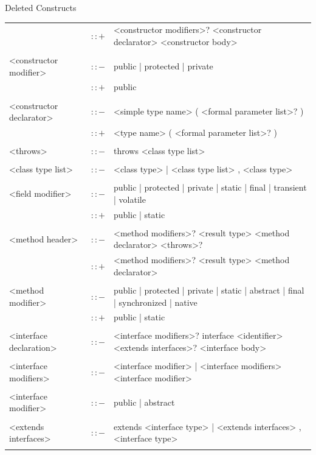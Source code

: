 \documentclass[landscape, 11pt]{article}
\begin{document}
\begin{qsection}{Deleted Constructs}
\begin{enumerate}[label=\bt{\theenumi.}]
\begin{longtable}{R{7cm} c L{15cm}}
															&	$\colon\colon+$	&	<constructor modifiers>? <constructor declarator> <constructor body> \\\\
				<constructor modifier>						&	$\colon\colon-$	&	public | protected | private \\
															&	$\colon\colon+$	&	public \\\\
				<constructor declarator>					&	$\colon\colon-$	&	<simple type name> ( <formal parameter list>? ) \\
															&	$\colon\colon+$	&	<type name> ( <formal parameter list>? ) \\\\
				<throws>									&	$\colon\colon-$	&	throws <class type list> \\\\
				<class type list>							&	$\colon\colon-$	&	<class type> | <class type list> , <class type> \\\\
				<field modifier>							&	$\colon\colon-$	&	public | protected | private | static | final | transient | volatile \\
															&	$\colon\colon+$	&	public | static \\\\
				<method header>								&	$\colon\colon-$	&	<method modifiers>? <result type> <method declarator> <throws>? \\
															&	$\colon\colon+$	&	<method modifiers>? <result type> <method declarator> \\\\
				<method modifier>							&	$\colon\colon-$	&	public | protected | private | static | abstract | final | synchronized | native \\
															&	$\colon\colon+$	&	public | static \\\\
				<interface declaration>						&	$\colon\colon-$	&	<interface modifiers>? interface <identifier> <extends interfaces>? <interface body> \\\\
				<interface modifiers>						&	$\colon\colon-$	&	<interface modifier> | <interface modifiers> <interface modifier> \\\\
				<interface modifier>						&	$\colon\colon-$	&	public | abstract \\\\
				<extends interfaces>						&	$\colon\colon-$	&	extends <interface type> | <extends interfaces> , <interface type> \\\\

\end{longtable}
\end{enumerate}
\end{qsection}
\end{document}

